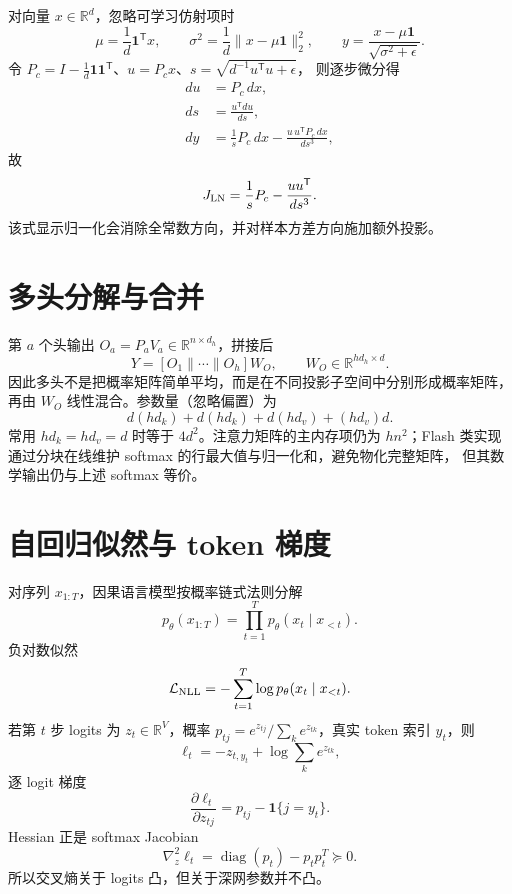 \documentclass[11pt]{article}
\numberwithin{equation}{section}
\newcommand{\R}{\mathbb{R}}
\newcommand{\1}{\mathbf{1}}
\newcommand{\T}{\mathsf{T}}
\newcommand{\cL}{\mathcal{L}}
\newcommand{\diag}{\operatorname{diag}}
\begin{document}
对向量 $x\in\R^d$，忽略可学习仿射项时
\begin{equation}
 \mu=\frac1d\1^{\T}x,\qquad
 \sigma^2=\frac1d\|x-\mu\1\|_2^2,\qquad
 y=\frac{x-\mu\1}{\sqrt{\sigma^2+\epsilon}}.
\end{equation}
令 $P_c=I-\frac1d\1\1^\T$、$u=P_cx$、$s=\sqrt{d^{-1}u^{\T}u+\epsilon}$，
则逐步微分得
\begin{align}
 du&=P_c\,dx,\\
 ds&=\frac{u^{\T}du}{d s},\\
 dy&=\frac1sP_c\,dx-\frac{u\,u^{\T}P_c\,dx}{d s^3},
\end{align}
故
\begin{equation}
 J_{\rm LN}=\frac1sP_c-\frac{uu^\T}{d s^3}.
\end{equation}
该式显示归一化会消除全常数方向，并对样本方差方向施加额外投影。

\section{多头分解与合并}

第 $a$ 个头输出 $O_a=P_aV_a\in\R^{n\times d_h}$，拼接后
\begin{equation}
 Y=[O_1\|\cdots\|O_h]W_O,
 \qquad W_O\in\R^{hd_h\times d}.
\end{equation}
因此多头不是把概率矩阵简单平均，而是在不同投影子空间中分别形成概率矩阵，
再由 $W_O$ 线性混合。参数量（忽略偏置）为
\begin{equation}
 d(hd_k)+d(hd_k)+d(hd_v)+(hd_v)d.
\end{equation}
常用 $hd_k=hd_v=d$ 时等于 $4d^2$。注意力矩阵的主内存项仍为
$h n^2$；Flash 类实现通过分块在线维护 softmax 的行最大值与归一化和，避免物化完整矩阵，
但其数学输出仍与上述 softmax 等价。

\section{自回归似然与 token 梯度}

对序列 $x_{1:T}$，因果语言模型按概率链式法则分解
\begin{equation}
 p_\theta(x_{1:T})=\prod_{t=1}^{T}p_\theta(x_t\mid x_{<t}).
\end{equation}
负对数似然
\begin{equation}
 \cL_{\rm NLL}=-\sum_{t=1}^{T}\log p_\theta(x_t\mid x_{<t}).
\end{equation}
若第 $t$ 步 logits 为 $z_t\in\R^{V}$，概率
$p_{tj}=e^{z_{tj}}/\sum_ke^{z_{tk}}$，真实 token 索引 $y_t$，则
\begin{equation}
 \ell_t=-z_{t,y_t}+\log\sum_ke^{z_{tk}},
\end{equation}
逐 logit 梯度
\begin{equation}
 \frac{\partial\ell_t}{\partial z_{tj}}
 =p_{tj}-\1\{j=y_t\}.
\end{equation}
Hessian 正是 softmax Jacobian
\begin{equation}
 \nabla_z^2\ell_t=\diag(p_t)-p_tp_t^T\succeq0.
\end{equation}
所以交叉熵关于 logits 凸，但关于深网参数并不凸。
\end{document}
